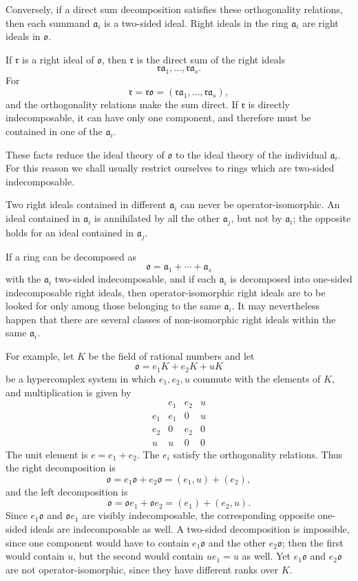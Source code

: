 \documentclass[11pt]{article}
\begin{document}
Conversely, if a direct sum decomposition satisfies these orthogonality
relations, then each summand \(\mathfrak a_i\) is a two-sided ideal.
Right ideals in the ring \(\mathfrak a_i\) are right ideals in
\(\mathfrak{o}\).

If \(\mathfrak r\) is a right ideal of \(\mathfrak{o}\), then
\(\mathfrak r\) is the direct sum of the right ideals \[
  \mathfrak r\mathfrak a_1,\ldots,\mathfrak r\mathfrak a_s.
\] For \[
  \mathfrak r=\mathfrak r\mathfrak{o}=(\mathfrak r\mathfrak a_1,\ldots,\mathfrak r\mathfrak a_s),
\] and the orthogonality relations make the sum direct. If
\(\mathfrak r\) is directly indecomposable, it can have only one
component, and therefore must be contained in one of the
\(\mathfrak a_i\).

These facts reduce the ideal theory of \(\mathfrak{o}\) to the ideal
theory of the individual \(\mathfrak a_i\). For this reason we shall
usually restrict ourselves to rings which are two-sided indecomposable.

Two right ideals contained in different \(\mathfrak a_i\) can never be
operator-isomorphic. An ideal contained in \(\mathfrak a_i\) is
annihilated by all the other \(\mathfrak a_j\), but not by
\(\mathfrak a_i\); the opposite holds for an ideal contained in
\(\mathfrak a_j\).

If a ring can be decomposed as \[
  \mathfrak{o}=\mathfrak a_1+\cdots+\mathfrak a_s
\] with the \(\mathfrak a_i\) two-sided indecomposable, and if each
\(\mathfrak a_i\) is decomposed into one-sided indecomposable right
ideals, then operator-isomorphic right ideals are to be looked for only
among those belonging to the same \(\mathfrak a_i\). It may nevertheless
happen that there are several classes of non-isomorphic right ideals
within the same \(\mathfrak a_i\).

For example, let \(K\) be the field of rational numbers and let \[
  \mathfrak{o}=e_1K+e_2K+uK
\] be a hypercomplex system in which \(e_1,e_2,u\) commute with the
elements of \(K\), and multiplication is given by \[
\begin{array}{c|ccc}
       & e_1&e_2&u\\ \hline
 e_1   & e_1&0&u\\
 e_2   & 0&e_2&0\\
 u     & u&0&0
\end{array}
\] The unit element is \(e=e_1+e_2\). The \(e_i\) satisfy the
orthogonality relations. Thus the right decomposition is \[
  \mathfrak{o}=e_1\mathfrak{o}+e_2\mathfrak{o}=(e_1,u)+(e_2),
\] and the left decomposition is \[
  \mathfrak{o}=\mathfrak{o}e_1+\mathfrak{o}e_2=(e_1)+(e_2,u).
\] Since \(e_1\mathfrak{o}\) and \(\mathfrak{o}e_1\) are visibly
indecomposable, the corresponding opposite one-sided ideals are
indecomposable as well. A two-sided decomposition is impossible, since
one component would have to contain \(e_1\mathfrak{o}\) and the other
\(e_2\mathfrak{o}\); then the first would contain \(u\), but the second
would contain \(ue_1=u\) as well. Yet \(e_1\mathfrak{o}\) and
\(e_2\mathfrak{o}\) are not operator-isomorphic, since they have
different ranks over \(K\).
\end{document}
